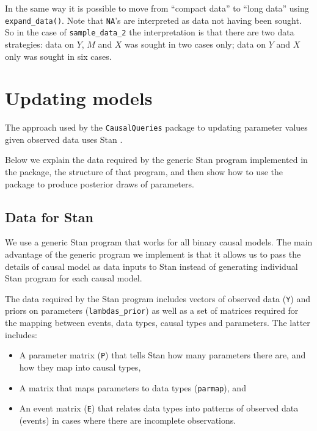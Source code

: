 \documentclass[
  11pt,
  article]{jss}
\providecommand{\tightlist}{%
  \setlength{\itemsep}{0pt}\setlength{\parskip}{0pt}}\usepackage{longtable,booktabs,array}
\begin{document}
In the same way it is possible to move from ``compact data'' to ``long
data'' using \texttt{expand\_data()}. Note that \texttt{NA}'s are
interpreted as data not having been sought. So in the case of
\texttt{sample\_data\_2} the interpretation is that there are two data
strategies: data on \(Y\), \(M\) and \(X\) was sought in two cases only;
data on \(Y\) and \(X\) only was sought in six cases.

\hypertarget{sec-update}{%
\section{Updating models}\label{sec-update}}

The approach used by the \texttt{CausalQueries} package to updating
parameter values given observed data uses Stan
\citep{carpenter_stan_2017}.

Below we explain the data required by the generic Stan program
implemented in the package, the structure of that program, and then show
how to use the package to produce posterior draws of parameters.

\hypertarget{data-for-stan}{%
\subsection{Data for Stan}\label{data-for-stan}}

We use a generic Stan program that works for all binary causal models.
The main advantage of the generic program we implement is that it allows
us to pass the details of causal model as data inputs to Stan instead of
generating individual Stan program for each causal model.

The data required by the Stan program includes vectors of observed data
(\texttt{Y}) and priors on parameters (\texttt{lambdas\_prior}) as well
as a set of matrices required for the mapping between events, data
types, causal types and parameters. The latter includes:

\begin{itemize}
\tightlist
\item
  A parameter matrix (\texttt{P}) that tells Stan how many parameters
  there are, and how they map into causal types,
\item
  A matrix that maps parameters to data types (\texttt{parmap}), and
\item
  An event matrix (\texttt{E}) that relates data types into patterns of
  observed data (events) in cases where there are incomplete
  observations.
\end{itemize}
\end{document}
